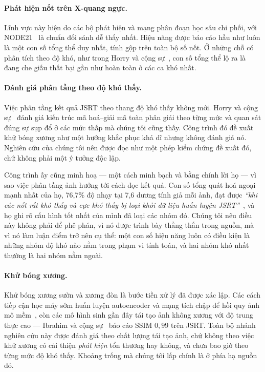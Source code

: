 \documentclass[12pt,a4paper]{article}
\begin{document}
\paragraph{Phát hiện nốt trên X-quang ngực.}
Lĩnh vực này hiện do các bộ phát hiện và mạng phân đoạn học sâu chi phối, với
NODE21~\cite{sogancioglu2024node21} là chuẩn đối sánh dễ thấy nhất. Hiệu năng
được báo cáo hầu như luôn là một con số tổng thể duy nhất, tính gộp trên toàn bộ
số nốt. Ở những chỗ có phân tích theo độ khó, như trong Horry và cộng
sự~\cite{horry2023fullres}, con số tổng thể lộ ra là đang che giấu thất bại gần
như hoàn toàn ở các ca khó nhất.

\paragraph{Đánh giá phân tầng theo độ khó thấy.}
Việc phân tầng kết quả JSRT theo thang độ khó thấy không mới. Horry và cộng
sự~\cite{horry2023fullres} đánh giá kiến trúc mã hoá--giải mã toàn phân giải theo
từng mức và quan sát đúng sự sụp đổ ở các mức thấp mà chúng tôi cũng thấy. Công
trình đó đề xuất khử bóng xương như một hướng khắc phục khả dĩ nhưng không đánh
giá nó. Nghiên cứu của chúng tôi nên được đọc như một phép kiểm chứng đề xuất
đó, chứ không phải một ý tưởng độc lập.

Công trình ấy cũng minh hoạ --- một cách minh bạch và bằng chính lời họ --- vì
sao việc phân tầng ảnh hưởng tới cách đọc kết quả. Con số tổng quát hoá ngoại
mạnh nhất của họ, 76,7\% độ nhạy tại 7,6 dương tính giả mỗi ảnh, đạt được
\emph{``khi các nốt rất khó thấy và cực khó thấy bị loại khỏi dữ liệu huấn luyện
JSRT''}~\cite{horry2023fullres}, và họ ghi rõ cấu hình tốt nhất của mình đã loại
các nhóm đó. Chúng tôi nêu điều này không phải để phê phán, vì nó được trình bày
thẳng thắn trong nguồn, mà vì nó làm luận điểm trở nên cụ thể: một con số hiệu
năng luôn có điều kiện là những nhóm độ khó nào nằm trong phạm vi tính toán, và
hai nhóm khó nhất thường là hai nhóm nằm ngoài.

\paragraph{Khử bóng xương.}
Khử bóng xương sườn và xương đòn là bước tiền xử lý đã được xác lập. Các cách
tiếp cận học máy sớm huấn luyện autoencoder và mạng tích chập để hồi quy ảnh mô
mềm~\cite{gusarev2017bonesup}, còn các mô hình sinh gần đây tái tạo ảnh không
xương với độ trung thực cao --- Ibrahim và cộng sự~\cite{ibrahim2025bonesup} báo
cáo SSIM $0{,}99$ trên JSRT. Toàn bộ nhánh nghiên cứu này được đánh giá theo chất
lượng tái tạo ảnh, chứ không theo việc khử xương có cải thiện \emph{phát hiện}
tổn thương hay không, và chưa bao giờ theo từng mức độ khó thấy. Khoảng trống mà
chúng tôi lấp chính là ở phía hạ nguồn đó.
\end{document}

